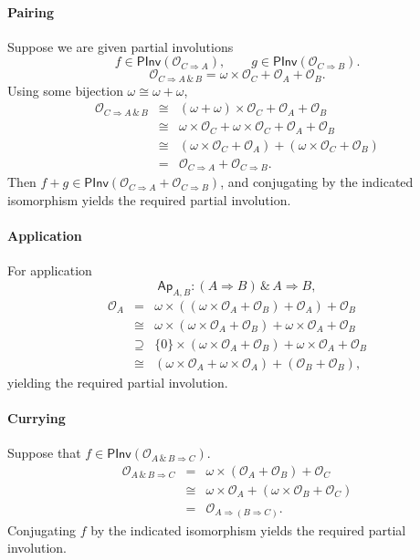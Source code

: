\documentclass[a4paper,11pt]{article}
\newcommand{\llwith}{\, \& \,}
\newcommand{\Occ}{\mathcal{O}}
\newcommand{\PInv}[1]{\mathsf{PInv}(#1)}
\begin{document}
\paragraph{Pairing}
Suppose we are given partial involutions
\[ f \in \PInv{\Occ_{C \Rightarrow A}}, \qquad g \in \PInv{\Occ_{C
      \Rightarrow B}} . \]
\[ \Occ_{C \Rightarrow A \llwith B} = \omega \times \Occ_{C} +
\Occ_{A} + \Occ_{B} . \]
Using some bijection $\omega \cong \omega + \omega$,
\[ \begin{array}{rcl}
\Occ_{C \Rightarrow A \llwith B} & \cong & (\omega + \omega) \times \Occ_{C} +
\Occ_{A} + \Occ_{B} \\
& \cong & \omega \times \Occ_C + \omega \times \Occ_C  +
\Occ_{A} + \Occ_{B} \\
& \cong & (\omega \times \Occ_C  +
\Occ_{A}) + (\omega \times \Occ_C  +
\Occ_{B}) \\
& = & \Occ_{C \Rightarrow A} +  \Occ_{C \Rightarrow B} .
\end{array} \]
Then $f + g \in \PInv{\Occ_{C \Rightarrow A} +  \Occ_{C \Rightarrow
    B}}$, and conjugating by the indicated isomorphism yields the
required partial involution.

\paragraph{Application}
For application
\[ \mathsf{Ap}_{A, B} : (A \Rightarrow B) \llwith A \Rightarrow B , \]
\[ \begin{array}{rcl}
\Occ_A & = & \omega \times ((\omega \times \Occ_A + \Occ_B ) + \Occ_A )
+ \Occ_B \\
& \cong & \omega \times (\omega \times \Occ_A + \Occ_B ) + \omega
\times \Occ_A + \Occ_B \\
& \supseteq & \{ 0 \} \times (\omega \times \Occ_A + \Occ_B ) + \omega
\times \Occ_A + \Occ_B \\
& \cong & (\omega \times \Occ_A + \omega \times \Occ_A ) + (\Occ_B +
\Occ_B ) ,
\end{array} \]
yielding the required partial involution.

\paragraph{Currying}
Suppose that $f \in \PInv{\Occ_{A \llwith B \Rightarrow C}}$.
\[ \begin{array}{rcl}
\Occ_{A \llwith B \Rightarrow C} & = & \omega \times (\Occ_A + \Occ_B
) + \Occ_C \\
& \cong & \omega \times \Occ_A + (\omega \times \Occ_B + \Occ_C ) \\
& = & \Occ_{A \Rightarrow (B \Rightarrow C)} .
\end{array} \]
Conjugating $f$  by the indicated isomorphism yields the required
partial involution.
\end{document}
